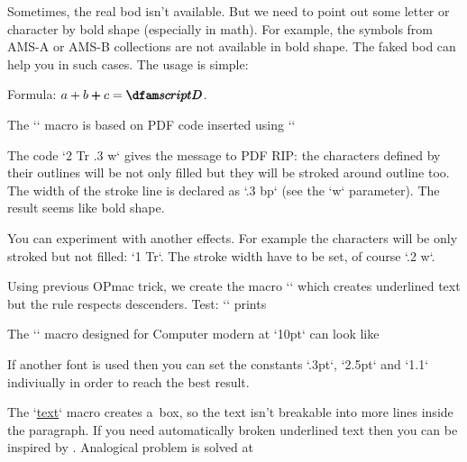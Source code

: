Sometimes, the real bod isn't available. But we need to point out some letter or character by bold shape (especially in math). For example, the symbols from AMS-A or AMS-B collections are not available in bold shape. The faked bod can help you in such cases. The usage is simple: 

\begtt
Formula: $a+b\fakebold{+}c = \fakebold{\script D}$. 
\endtt


The `\fakebold` macro is based on PDF code inserted using `\pdfliteral` 

\begtt
\def\fakebold#1{\pdfliteral{2 Tr .3 w}#1\pdfliteral{0 Tr 0 w}} 
\endtt


The code `2 Tr .3 w` gives the message to PDF RIP: the characters defined by their outlines will be not only filled but they will be stroked around outline too. The width of the stroke line is declared as `.3 bp` (see the `w` parameter). The result seems like bold shape. 



You can experiment with another effects. For example the characters will be only stroked but not filled: `1 Tr`. The stroke width have to be set, of course `.2 w`. 


 


Using previous OPmac trick, we create the macro `` which creates underlined text but the rule respects descenders. Test: `` prints 






The `\underlinee` macro designed for Computer modern at `10pt` can look like 

\begtt
\def\underlinee#1{%
   \leavevmode\vbox to0pt{\vss 
      \hrule height.3pt 
      \vskip-\baselineskip \kern2.5pt 
      \localcolor 
      \hbox{\strut\rlap{\White\pdfliteral{2 Tr 1.1 w}#1\pdfliteral{0 Tr 0 w}}#1} 
}} 
\endtt


If another font is used then you can set the constants `.3pt`, `2.5pt` and `1.1` indiviually in order to reach the best result. 



The `\underline{text}` macro creates a~box, so the text isn't breakable into more lines inside the paragraph. If you need automatically broken underlined text then you can be inspired by . Analogical problem is solved at  



